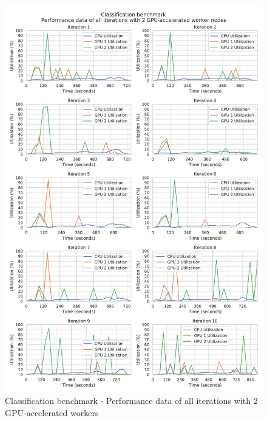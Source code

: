\begin{figure}[h]
\centering
\includegraphics[scale=0.5]{images/appendix/evaluation_data/classification_benchmark/classification_gpu2_performance}
\caption{Classification benchmark - Performance data of all iterations with 2 GPU-accelerated workers}
\label{fig:appendix_eval_classification_gpu2}
\end{figure}

